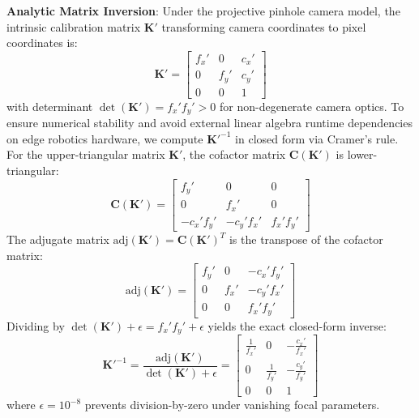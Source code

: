 \noindent\textbf{Analytic Matrix Inversion}: Under the projective pinhole camera model, the intrinsic calibration matrix $\mathbf{K}'$ transforming camera coordinates to pixel coordinates is:
\begin{equation}
    \mathbf{K}' = \begin{bmatrix} f_x' & 0 & c_x' \\ 0 & f_y' & c_y' \\ 0 & 0 & 1 \end{bmatrix}
\end{equation}
with determinant $\det(\mathbf{K}') = f_x' f_y' > 0$ for non-degenerate camera optics. To ensure numerical stability and avoid external linear algebra runtime dependencies on edge robotics hardware, we compute $\mathbf{K}'^{-1}$ in closed form via Cramer's rule. For the upper-triangular matrix $\mathbf{K}'$, the cofactor matrix $\mathbf{C}(\mathbf{K}')$ is lower-triangular:
\begin{equation}
    \mathbf{C}(\mathbf{K}') = \begin{bmatrix} f_y' & 0 & 0 \\ 0 & f_x' & 0 \\ -c_x' f_y' & -c_y' f_x' & f_x' f_y' \end{bmatrix}
\end{equation}
The adjugate matrix $\text{adj}(\mathbf{K}') = \mathbf{C}(\mathbf{K}')^T$ is the transpose of the cofactor matrix:
\begin{equation}
    \text{adj}(\mathbf{K}') = \begin{bmatrix} f_y' & 0 & -c_x' f_y' \\ 0 & f_x' & -c_y' f_x' \\ 0 & 0 & f_x' f_y' \end{bmatrix}
\end{equation}
Dividing by $\det(\mathbf{K}') + \epsilon = f_x' f_y' + \epsilon$ yields the exact closed-form inverse:
\begin{equation}
    \mathbf{K}'^{-1} = \frac{\text{adj}(\mathbf{K}')}{\det(\mathbf{K}') + \epsilon} = \begin{bmatrix} \frac{1}{f_x'} & 0 & -\frac{c_x'}{f_x'} \\ 0 & \frac{1}{f_y'} & -\frac{c_y'}{f_y'} \\ 0 & 0 & 1 \end{bmatrix}
    \label{eq:k_inverse}
\end{equation}
where $\epsilon = 10^{-8}$ prevents division-by-zero under vanishing focal parameters. 

